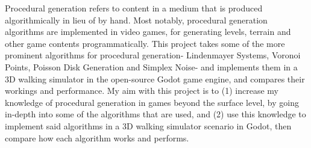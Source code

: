 Procedural generation refers to content in a medium that is produced algorithmically in lieu of by hand. Most notably, procedural generation algorithms are implemented in video games, for generating levels, terrain and other game contents programmatically. This project takes some of the more prominent algorithms for procedural generation- Lindenmayer Systems, Voronoi Points, Poisson Disk Generation and Simplex Noise- and implements them in a 3D walking simulator in the open-source Godot game engine, and compares their workings and performance. My aim with this project is to (1) increase my knowledge of procedural generation in games beyond the surface level, by going in-depth into some of the algorithms that are used, and (2) use this knowledge to implement said algorithms in a 3D walking simulator scenario in Godot, then compare how each algorithm works and performs.